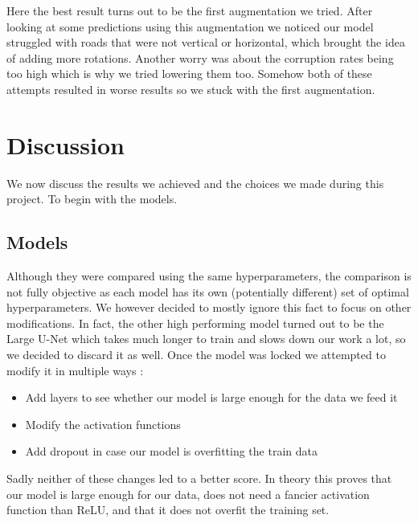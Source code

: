 \documentclass[10pt,conference,compsocconf]{IEEEtran}
\begin{document}
Here the best result turns out to be the first augmentation we tried. After looking at some predictions using this augmentation we noticed our model struggled with roads that were not vertical or horizontal, which brought the idea of adding more rotations. Another worry was about the corruption rates being too high which is why we tried lowering them too. Somehow both of these attempts resulted in worse results so we stuck with the first augmentation.
\section{Discussion}
We now discuss the results we achieved and the choices we made during this project. To begin with the models. 
\subsection{Models}
Although they were compared using the same hyperparameters, the comparison is not fully objective as each model has its own (potentially different) set of optimal hyperparameters. We however decided to mostly ignore this fact to focus on other modifications. In fact, the other high performing model turned out to be the Large U-Net which takes much longer to train and slows down our work a lot, so we decided to discard it as well.
\newline
Once the model was locked we attempted to modify it in multiple ways : 
\begin{itemize}
\item Add layers to see whether our model is large enough for the data we feed it
\item Modify the activation functions
\item Add dropout in case our model is overfitting the train data
\end{itemize}
Sadly neither of these changes led to a better score. In theory this proves that our model is large enough for our data, does not need a fancier activation function than ReLU, and that it does not overfit the training set.
\end{document}
